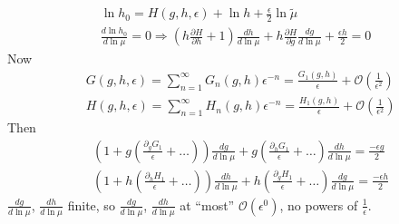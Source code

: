 \documentclass[twoside]{amsart}
\begin{document}
\begin{itemize}
\[
\begin{gathered}
  \ln{ h_0 } = H(g,h,\epsilon) + \ln{h} + \frac{\epsilon}{2} \ln{\widetilde{\mu}} \\ 
  \frac{ d\ln{ h_0}}{ d\ln{ \mu}} = 0  \Longrightarrow \left( h \frac{ \partial H}{ \partial h} + 1 \right) \frac{dh}{ d\ln{ \mu}} + h \frac{\partial H}{ \partial g } \frac{ dg}{ d\ln{ \mu}} + \frac{ \epsilon h}{ 2}  =0 
\end{gathered}
\]
Now
\[
\begin{aligned}
  & G(g,h,\epsilon) = \sum_{n=1}^{\infty} G_n(g,h) \epsilon^{-n} = \frac{ G_1(g,h)}{\epsilon} + \mathcal{O}\left( \frac{1}{\epsilon^2}\right) \\ 
  & H(g,h,\epsilon) = \sum_{n=1}^{\infty} H_n(g,h) \epsilon^{-n} = \frac{ H_1(g,h)}{\epsilon} + \mathcal{O}\left( \frac{1}{\epsilon^2}\right) 
\end{aligned}
\]
Then
\[
\begin{aligned}
  & \left( 1 + g \left( \frac{ \partial_g G_1 }{ \epsilon} + \dots \right) \right) \frac{dg}{ d\ln{ \mu}} + g \left( \frac{ \partial_h G_1}{ \epsilon} + \dots \right) \frac{dh}{ d\ln{ \mu}} = \frac{- \epsilon g}{2} \\ 
  & \left( 1 + h \left( \frac{ \partial_h H_1 }{ \epsilon} + \dots \right) \right) \frac{dh}{ d\ln{ \mu}} + h \left( \frac{ \partial_g H_1}{ \epsilon} + \dots \right) \frac{dg}{ d\ln{ \mu}} = \frac{- \epsilon h}{2}  
\end{aligned}
\]
$ \frac{dg}{ d\ln{ \mu}}$, $\frac{dh}{d \ln{\mu}}$ finite, so $\frac{dg}{d\ln{ \mu}}$, $\frac{dh}{ d \ln{\mu}}$ at ``most'' $\mathcal{O}(\epsilon^0)$, no powers of $\frac{1}{ \epsilon}$.  


\end{itemize}
\end{document}
